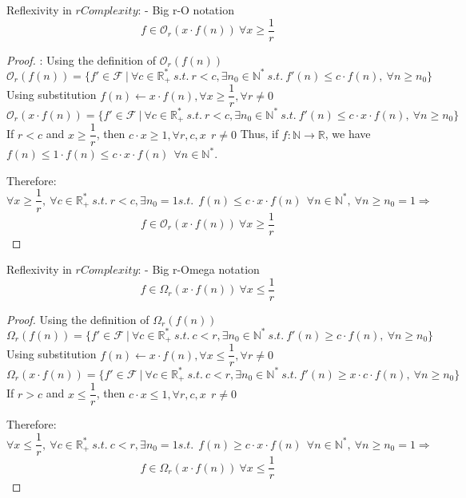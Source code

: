 \begin{theorem}
    Reflexivity in $rComplexity$: - Big r-O notation
    \[ f \in \mathcal{O}_{r} \left( x \cdot f(n) \right)\ \forall x \geq \dfrac{1}{r} \]
\end{theorem}
\begin{proof}
    :
    Using the definition of $ \mathcal{O}_{r}(f(n))$
    \[\mathcal{O}_{r}(f(n)) = \lbrace f' \in \mathcal{F}\ |\ \forall c  \in \mathbb{R}^{*}_{+} \ s.t.\  r<c, \exists n_{0} \in \mathbb{N}^{*}\ s.t.\  f'(n) \leq c \cdot f(n),\  \forall n \geq n_{0} \rbrace\]
    Using substitution $ f(n) \longleftarrow x \cdot f(n), \forall x \geq \dfrac{1}{r}, \forall r \neq 0$
    \[\mathcal{O}_{r}(x \cdot f(n)) = \lbrace f' \in \mathcal{F}\ |\ \forall c  \in \mathbb{R}^{*}_{+} \ s.t.\  r<c, \exists n_{0} \in \mathbb{N}^{*}\ s.t.\  f'(n) \leq c \cdot x \cdot f(n),\  \forall n \geq n_{0} \rbrace\]
    If $r<c$ and $x \geq \dfrac{1}{r}$, then $c \cdot x \geq 1, \forall r,c,x\ \ r \neq 0$
    Thus, if $f:\mathbb{N}\longrightarrow\mathbb{R}$, we have $ f(n) \leq 1 \cdot f(n) \leq  c \cdot x\cdot f(n) \ \ \forall n \in \mathbb{N}^{*}$.

    Therefore:
    \[\forall x \geq \dfrac{1}{r}, \ \forall c \in \mathbb{R}^{*}_{+} \ s.t.\  r<c , \exists n_{0} = 1 s.t.\  \  f(n) \leq  c \cdot x\cdot f(n) \ \ \forall n \in \mathbb{N}^{*} ,\  \forall n \geq n_{0}=1 \Rightarrow \]
    \[ f \in \mathcal{O}_{r} \left( x \cdot f(n) \right)\ \forall x \geq \dfrac{1}{r} \]
\end{proof}

\begin{theorem}
    Reflexivity in $rComplexity$: - Big r-Omega notation
    \[ f \in \Omega_{r} \left( x \cdot f(n) \right)\ \forall x \leq \dfrac{1}{r} \]
\end{theorem}
\begin{proof}
    Using the definition of $\Omega_{r}(f(n))$
    \[\Omega_{r}(f(n)) = \lbrace f' \in \mathcal{F}\ |\ \forall c  \in \mathbb{R}^{*}_{+} \ s.t.\  c<r, \exists n_{0} \in \mathbb{N}^{*}\ s.t.\  f'(n) \geq c \cdot f(n),\  \forall n \geq n_{0} \rbrace\]
    Using substitution $ f(n) \longleftarrow x \cdot f(n), \forall x \leq \dfrac{1}{r}, \forall r \neq 0$
    \[\Omega_{r}(x \cdot f(n)) = \lbrace f' \in \mathcal{F}\ |\ \forall c  \in \mathbb{R}^{*}_{+} \ s.t.\  c<r, \exists n_{0} \in \mathbb{N}^{*}\ s.t.\  f'(n) \geq x \cdot c \cdot f(n),\  \forall n \geq n_{0} \rbrace\]
    If $r>c$ and $x \leq \dfrac{1}{r}$, then $c \cdot x \leq 1, \forall r,c,x\ \ r \neq 0$

    Therefore:
    \[\forall x \leq \dfrac{1}{r}, \ \forall c \in \mathbb{R}^{*}_{+} \ s.t.\  c<r , \exists n_{0} = 1 s.t.\  \  f(n) \geq  c \cdot x\cdot f(n) \ \ \forall n \in \mathbb{N}^{*} ,\  \forall n \geq n_{0}=1 \Rightarrow \]
    \[ f \in \Omega_{r} \left( x \cdot f(n) \right)\ \forall x \leq \dfrac{1}{r} \]
\end{proof}



